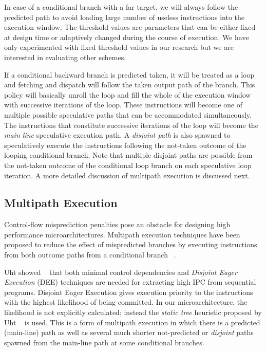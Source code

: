 \documentclass[10pt,twocolumn]{IEEEtran}
\begin{document}
In case of a conditional branch with a far target, 
we will always follow the predicted path to
avoid loading large number of useless instructions into the execution window.
The threshold values are parameters that can be either fixed at
design time or adaptively changed during the course of execution.  
We have only experimented with fixed threshold values in our research but
we are interested in evaluating other schemes.

If a conditional backward branch is predicted taken, it will be treated
as a loop and fetching and dispatch will follow the taken output path
of the branch.
This policy will basically unroll the loop and 
fill the whole of the execution window with
successive iterations of the loop.
These instructions will become one of multiple possible speculative
paths that can be accommodated simultaneously.
The instructions that constitute successive iterations of the
loop will become the \emph{main line} speculative execution path.
%
%
A \emph{disjoint path} is also spawned to speculatively execute the
instructions following the not-taken outcome of the looping conditional
branch.
Note that multiple disjoint paths are possible from the not-taken
outcome of the conditional loop branch on each speculative loop iteration.
A more detailed discussion of multipath execution is discussed next.
%
%
\subsection{Multipath Execution}
%
Control-flow misprediction penalties pose an obstacle for
designing high performance microarchitectures.  Multipath
execution techniques have been proposed to reduce the effect of
mispredicted branches by executing instructions from both
outcome paths from a conditional branch ~\cite{Ahuja98}.

Uht showed ~\cite{Uht95} that both minimal control
dependencies and
\emph{Disjoint Eager Execution} (DEE) techniques are needed for 
extracting high IPC from sequential programs.
Disjoint Eager Execution gives 
execution priority to the instructions with the highest
likelihood of being committed.  In our microarchitecture, the
likelihood is not explicitly calculated; instead the \emph{static
tree} heuristic proposed by Uht ~\cite{Uht95} is used.  
This is a form of
multipath execution in which there is a predicted (main-line) path
as well as several much shorter not-predicted or \emph{disjoint}
paths spawned from the main-line path at some conditional
branches.
\end{document}
